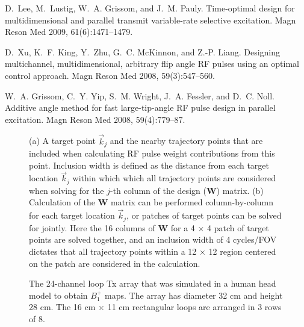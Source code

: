 \documentclass[11pt]{article}
\begin{document}
\begin{thebibliography}{10}
D.~Lee, M.~Lustig, W.~A. Grissom, and J.~M. Pauly.
\newblock Time-optimal design for multidimensional and parallel transmit
  variable-rate selective excitation.
\newblock Magn Reson Med 2009, 61(6):1471--1479.

D.~Xu, K.~F. King, Y.~Zhu, G.~C. McKinnon, and Z.-P. Liang.
\newblock Designing multichannel, multidimensional, arbitrary flip angle {RF}
  pulses using an optimal control approach.
\newblock Magn Reson Med 2008, 59(3):547--560.

W.~A. Grissom, C.~Y. Yip, S.~M. Wright, J.~A. Fessler, and D.~C. Noll.
\newblock Additive angle method for fast large-tip-angle {RF} pulse design in
  parallel excitation.
\newblock Magn Reson Med 2008, 59(4):779--87.





\end{thebibliography}


\pagebreak

\begin{figure}
	\centering
	\caption{(a) A target point $\vec{k}_j$ and the nearby trajectory points that are included when calculating 
	RF pulse weight contributions from this point.
	Inclusion width is defined as the distance from each target location $\vec{k}_j$ within which 
	which all trajectory points are considered when solving for the $j$-th column of the design ($\bm{W}$) matrix.
	(b) Calculation of the $\bm{W}$ matrix can be performed column-by-column for each target location $\vec{k}_j$,
	or patches of target points can be solved for jointly. 
	Here the 16 columns of $\bm{W}$ for a 4 $\times$ 4 patch of target points are solved together,
	and an inclusion width of 4 cycles/FOV dictates that all trajectory points within a 12 $\times$ 12 region
	centered on the patch are considered in the calculation.}
	\label{fig:Patch}
\end{figure}

\begin{figure}
	\centering
	\caption{The 24-channel loop Tx array that was simulated in a human head model to obtain $B_1^+$ maps. 
	The array has diameter 32 cm and height 28 cm. The 16 cm $\times$ 11 cm rectangular loops are arranged in 3 rows of 8.}
	\label{fig:Coil}
\end{figure}
\end{document}
